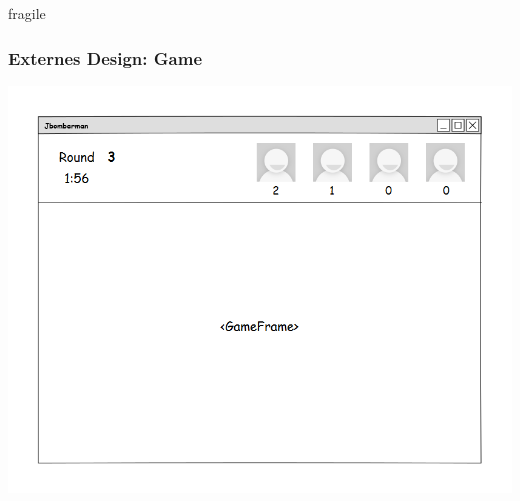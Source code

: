 \documentclass[10pt, compress]{beamer}
\begin{document}
\begin{frame}{fragile}
	\frametitle{Externes Design: Game}
	\begin{center}
	  \includegraphics[scale=0.3]{game}
	\end{center}
	
\end{frame}
\end{document}
